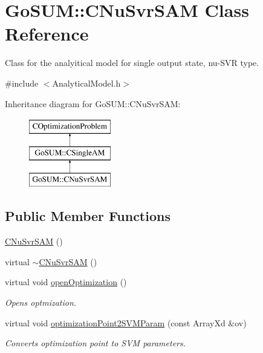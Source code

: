 \hypertarget{class_go_s_u_m_1_1_c_nu_svr_s_a_m}{\section{Go\-S\-U\-M\-:\-:C\-Nu\-Svr\-S\-A\-M Class Reference}
\label{class_go_s_u_m_1_1_c_nu_svr_s_a_m}
}


Class for the analyitical model for single output state, nu-\/\-S\-V\-R type.  




{\ttfamily \#include $<$Analytical\-Model.\-h$>$}

Inheritance diagram for Go\-S\-U\-M\-:\-:C\-Nu\-Svr\-S\-A\-M\-:\begin{figure}[H]
\begin{center}
\leavevmode
\includegraphics[height=3.000000cm]{class_go_s_u_m_1_1_c_nu_svr_s_a_m}
\end{center}
\end{figure}
\subsection*{Public Member Functions}
\begin{DoxyCompactItemize}
\item 
\hyperlink{class_go_s_u_m_1_1_c_nu_svr_s_a_m_acf81ebc1cc4dd607cec88bca0eceb8ac}{C\-Nu\-Svr\-S\-A\-M} ()
\item 
virtual \hyperlink{class_go_s_u_m_1_1_c_nu_svr_s_a_m_af8d6d8311722da418baa15b6f1d59f13}{$\sim$\-C\-Nu\-Svr\-S\-A\-M} ()
\item 
virtual void \hyperlink{class_go_s_u_m_1_1_c_nu_svr_s_a_m_a86f64a2aa6813481b3383eb0088efbbb}{open\-Optimization} ()
\begin{DoxyCompactList}\small\item\em Opens optmization. \end{DoxyCompactList}\item 
virtual void \hyperlink{class_go_s_u_m_1_1_c_nu_svr_s_a_m_aaa361789765b9862fb1ba2b04f0c24ac}{optimization\-Point2\-S\-V\-M\-Param} (const Array\-Xd \&ov)
\begin{DoxyCompactList}\small\item\em Converts optimization point to S\-V\-M parameters. \end{DoxyCompactList}\end{DoxyCompactItemize}
